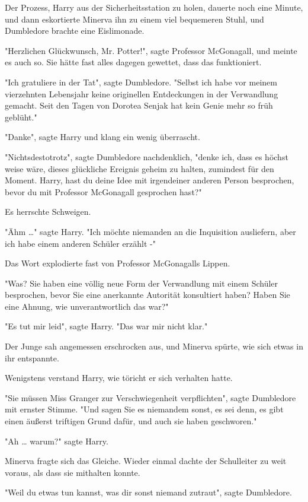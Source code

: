 {Der Prozess, Harry aus der Sicherheitsstation zu holen, dauerte noch eine Minute, und dann eskortierte Minerva ihn zu einem viel bequemeren Stuhl, und Dumbledore brachte eine Eislimonade.

"Herzlichen Glückwunsch, Mr. Potter!", sagte Professor McGonagall, und meinte es auch so. Sie hätte fast alles dagegen gewettet, dass das funktioniert.

"Ich gratuliere in der Tat", sagte Dumbledore. "Selbst ich habe vor meinem vierzehnten Lebensjahr keine originellen Entdeckungen in der Verwandlung gemacht. Seit den Tagen von Dorotea Senjak hat kein Genie mehr so früh geblüht."

"Danke", sagte Harry und klang ein wenig überrascht.

"Nichtsdestotrotz", sagte Dumbledore nachdenklich, "denke ich, dass es höchst weise wäre, dieses glückliche Ereignis geheim zu halten, zumindest für den Moment. Harry, hast du deine Idee mit irgendeiner anderen Person besprochen, bevor du mit Professor McGonagall gesprochen hast?"

Es herrschte Schweigen.

"Ähm …" sagte Harry. "Ich möchte niemanden an die Inquisition ausliefern, aber ich habe einem anderen Schüler erzählt -"

Das Wort explodierte fast von Professor McGonagalls Lippen.

"Was? Sie haben eine völlig neue Form der Verwandlung mit einem Schüler besprochen, bevor Sie eine anerkannte Autorität konsultiert haben? Haben Sie eine Ahnung, wie unverantwortlich das war?"

"Es tut mir leid", sagte Harry. "Das war mir nicht klar."

Der Junge sah angemessen erschrocken aus, und Minerva spürte, wie sich etwas in ihr entspannte.

Wenigstens verstand Harry, wie töricht er sich verhalten hatte.

"Sie müssen Miss Granger zur Verschwiegenheit verpflichten", sagte Dumbledore mit ernster Stimme. "Und sagen Sie es niemandem sonst, es sei denn, es gibt einen äußerst triftigen Grund dafür, und auch sie haben geschworen."

"Ah … warum?" sagte Harry.

Minerva fragte sich das Gleiche. Wieder einmal dachte der Schulleiter zu weit voraus, als dass sie mithalten konnte.

"Weil du etwas tun kannst, was dir sonst niemand zutraut", sagte Dumbledore.

}
